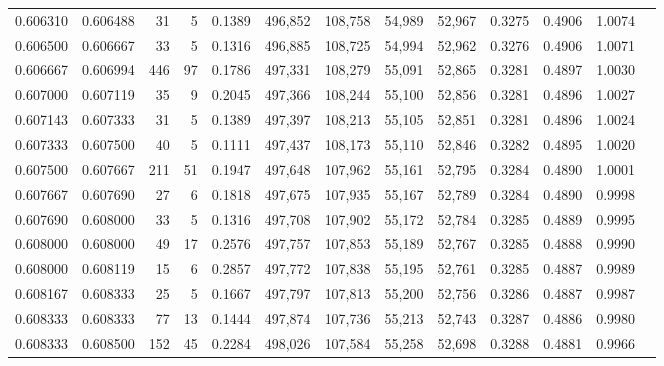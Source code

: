 \begin{tabular}{rrrrrrrrrrrrr}
0.606310 & 0.606488 &    31 &   5 &                                     0.1389 & 496,852 & 108,758 &  54,989 &  52,967 & 0.3275 & 0.4906 & 1.0074 \\
0.606500 & 0.606667 &    33 &   5 &                                     0.1316 & 496,885 & 108,725 &  54,994 &  52,962 & 0.3276 & 0.4906 & 1.0071 \\
0.606667 & 0.606994 &   446 &  97 &                                     0.1786 & 497,331 & 108,279 &  55,091 &  52,865 & 0.3281 & 0.4897 & 1.0030 \\
0.607000 & 0.607119 &    35 &   9 &                                     0.2045 & 497,366 & 108,244 &  55,100 &  52,856 & 0.3281 & 0.4896 & 1.0027 \\
0.607143 & 0.607333 &    31 &   5 &                                     0.1389 & 497,397 & 108,213 &  55,105 &  52,851 & 0.3281 & 0.4896 & 1.0024 \\
0.607333 & 0.607500 &    40 &   5 &                                     0.1111 & 497,437 & 108,173 &  55,110 &  52,846 & 0.3282 & 0.4895 & 1.0020 \\
0.607500 & 0.607667 &   211 &  51 &                                     0.1947 & 497,648 & 107,962 &  55,161 &  52,795 & 0.3284 & 0.4890 & 1.0001 \\
0.607667 & 0.607690 &    27 &   6 &                                     0.1818 & 497,675 & 107,935 &  55,167 &  52,789 & 0.3284 & 0.4890 & 0.9998 \\
0.607690 & 0.608000 &    33 &   5 &                                     0.1316 & 497,708 & 107,902 &  55,172 &  52,784 & 0.3285 & 0.4889 & 0.9995 \\
0.608000 & 0.608000 &    49 &  17 &                                     0.2576 & 497,757 & 107,853 &  55,189 &  52,767 & 0.3285 & 0.4888 & 0.9990 \\
0.608000 & 0.608119 &    15 &   6 &                                     0.2857 & 497,772 & 107,838 &  55,195 &  52,761 & 0.3285 & 0.4887 & 0.9989 \\
0.608167 & 0.608333 &    25 &   5 &                                     0.1667 & 497,797 & 107,813 &  55,200 &  52,756 & 0.3286 & 0.4887 & 0.9987 \\
0.608333 & 0.608333 &    77 &  13 &                                     0.1444 & 497,874 & 107,736 &  55,213 &  52,743 & 0.3287 & 0.4886 & 0.9980 \\
0.608333 & 0.608500 &   152 &  45 &                                     0.2284 & 498,026 & 107,584 &  55,258 &  52,698 & 0.3288 & 0.4881 & 0.9966 \\

\end{tabular}
